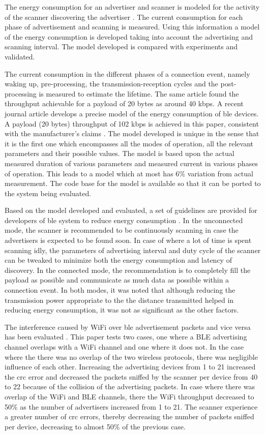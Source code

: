 The energy consumption for an advertiser and scanner is modeled for the activity of the scanner discovering the advertiser  \cite{liu2012energy}. The current consumption for each phase of advertisement and scanning is measured. Using this information a model of the energy consumption is developed taking into account the advertising and scanning interval. The model developed is compared with experiments and validated. 

The current consumption in the different phases of a connection event, namely waking up, pre-processing, the transmission-reception cycles and the post-processing is measured  \cite{Mackensen2012} to estimate the lifetime. The same article found the throughput achievable for a payload of 20 bytes as around 40 kbps. A recent journal article  \cite{Kindt2014} develops a precise model of the energy consumption of \gls{ble} devices. A payload (20 bytes) throughput of 102 kbps is achieved in this paper, consistent with the manufacturer's claims  \cite{MikkoSavolainen}. The model developed is  unique in the sense that it is the first one which encompasses all the modes of operation, all the relevant parameters and their possible values. The model is based upon the actual measured duration of various parameters and measured current in various phases of operation. This leads to a model which at most has 6\% variation from actual measurement. The code base for the model is available so that it can be ported to the system being evaluated.

Based on the model developed and evaluated, a set of guidelines are provided for developers of \gls{ble} system to reduce energy consumption  \cite{Kindt2014}. In the unconnected mode, the scanner is recommended to be continuously scanning in case the advertisers is expected to be found soon. In case of where a lot of time is spent scanning idly, the parameters of advertising interval and duty cycle of the scanner can be tweaked to minimize both the energy consumption and latency of discovery. In the connected mode, the recommendation is to completely fill the payload as possible and communicate as much data as possible within a connection event. In both modes, it was noted that although reducing the transmission power appropriate to the the distance transmitted helped in reducing energy consumption, it was not as significant as the other factors.

The interference caused by WiFi over \gls{ble} advertisement packets and vice versa has been evaluated \cite{Wyffels}. This paper tests two cases, one where a BLE advertising channel overlaps with a WiFi channel and one where it does not. In the case where the there was no overlap of the two wireless protocols, there was negligible influence of each other. Increasing the advertising devices from 1 to 21 increased the \gls{crc} error and decreased the packets sniffed by the scanner per device from 40 to 22 because of the collision of the advertising packets. In case where there was overlap of the WiFi and BLE channels, there the WiFi throughput decreased to 50\% as the number of advertisers increased from 1 to 21. The scanner experience a greater number of \gls{crc} errors, thereby decreasing the number of packets sniffed per device, decreasing to almost 50\% of the previous case.

